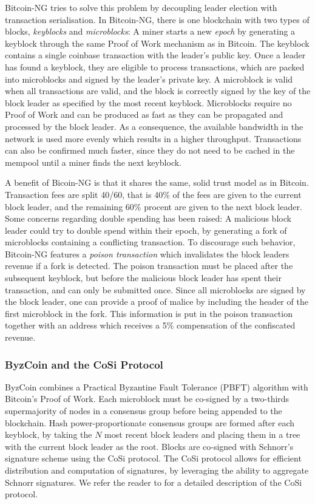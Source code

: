 \documentclass{style/kththesis}
\begin{document}
Bitcoin-NG \cite{Eyal15} tries to solve this problem by decoupling leader election with transaction serialisation. In Bitcoin-NG, there is one blockchain with two types of blocks, \emph{keyblocks} and \emph{microblocks}: A miner starts a new \emph{epoch} by generating a keyblock through the same Proof of Work mechanism as in Bitcoin. The keyblock contains a single coinbase transaction with the leader's public key. Once a leader has found a keyblock, they are eligible to process transactions, which are packed into microblocks and signed by the leader's private key. A microblock is valid when all transactions are valid, and the block is correctly signed by the key of the block leader as specified by the most recent keyblock. Microblocks require no Proof of Work and can be produced as fast as they can be propagated and processed by the block leader. As a consequence, the available bandwidth in the network is used more evenly which results in a higher throughput. Transactions can also be confirmed much faster, since they do not need to be cached in the mempool until a miner finds the next keyblock. 

A benefit of Bicoin-NG is that it shares the same, solid trust model as in Bitcoin. Transaction fees are split 40/60, that is 40\% of the fees are given to the current block leader, and the remaining 60\% procent are given to the next block leader. Some concerns regarding double spending has been raised: A malicious block leader could try to double spend within their epoch, by generating a fork of microblocks containing a conflicting transaction. To discourage such behavior, Bitcoin-NG features a \textit{poison transaction} which invalidates the block leaders revenue if a fork is detected. The poison transaction must be placed after the subsequent keyblock, but before the malicious block leader has spent their transaction, and can only be submitted once. Since all microblocks are signed by the block leader, one can provide a proof of malice by including the header of the first microblock in the fork. This information is put in the poison transaction together with an address which receives a 5\% compensation of the confiscated revenue.

\subsubsection{ByzCoin and the CoSi Protocol}
ByzCoin \cite{Kokoris16} combines a Practical Byzantine Fault Tolerance (PBFT) algorithm with Bitcoin's Proof of Work. Each microblock must be co-signed by a two-thirds supermajority of nodes in a consensus group before being appended to the blockchain. Hash power-proportionate consensus groups are formed after each keyblock, by taking the $N$ most recent block leaders and placing them in a tree with the current block leader as the root. Blocks are co-signed with Schnorr's signature scheme using the CoSi protocol. The CoSi protocol allows for efficient distribution and computation of signatures, by leveraging the ability to aggregate Schnorr signatures. We refer the reader to \cite{Syta16} for a detailed description of the CoSi protocol.
\end{document}
